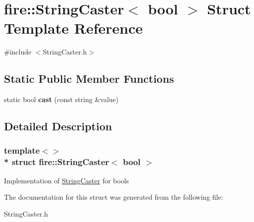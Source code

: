 \hypertarget{a00293}{}\section{fire\+:\+:String\+Caster$<$ bool $>$ Struct Template Reference}
\label{a00293}


{\ttfamily \#include $<$String\+Caster.\+h$>$}

\subsection*{Static Public Member Functions}
\begin{DoxyCompactItemize}
\item 
static bool {\bfseries cast} (const string \&value)\hypertarget{a00293_a852e5b28ba000a44312d3ebcb3703e48}{}\label{a00293_a852e5b28ba000a44312d3ebcb3703e48}

\end{DoxyCompactItemize}


\subsection{Detailed Description}
\subsubsection*{template$<$$>$\\*
struct fire\+::\+String\+Caster$<$ bool $>$}

Implementation of \hyperlink{a00292}{String\+Caster} for bools 

The documentation for this struct was generated from the following file\+:\begin{DoxyCompactItemize}
\item 
String\+Caster.\+h\end{DoxyCompactItemize}
